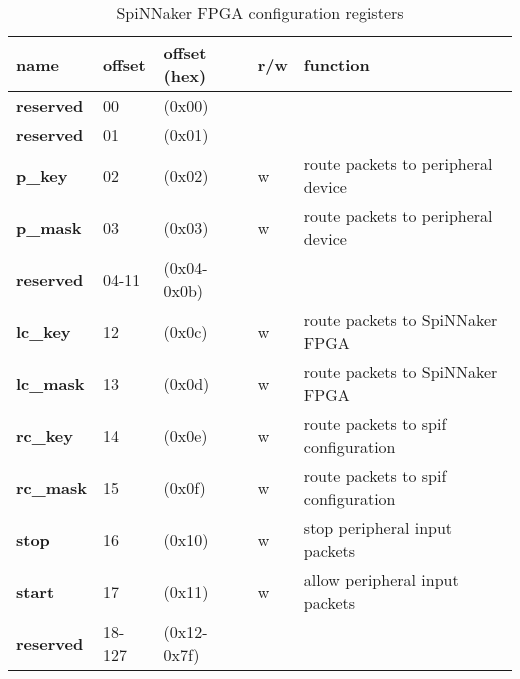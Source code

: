 \documentclass[11pt,a4paper,twoside]{article}
\begin{document}
\begin{center}
\begin{table}[!h]
	\begin{tabularx}{\textwidth}{| p{34mm} p{13mm} p{21mm} p{7mm} X |}
		\hline
		\textbf{name}                        & \textbf{offset}           & \textbf{offset} (hex)           & \textbf{r/w}        & \textbf{function} \\%
		\hline
		\hline
		\cellcolor{gray!25}\textbf{reserved} & \cellcolor{gray!25}00     & \cellcolor{gray!25}(0x00)       & \cellcolor{gray!25} & \cellcolor{gray!25}\\%
		\cellcolor{gray!25}\textbf{reserved} & \cellcolor{gray!25}01     & \cellcolor{gray!25}(0x01)       & \cellcolor{gray!25} & \cellcolor{gray!25}\\%
		\textbf{p\_key}                      & 02                        & (0x02)                          & w                   & route packets to peripheral device             \\%
		\textbf{p\_mask}                     & 03                        & (0x03)                          & w                   & route packets to peripheral device             \\%
		\cellcolor{gray!25}\textbf{reserved} & \cellcolor{gray!25}04-11  & \cellcolor{gray!25} (0x04-0x0b) & \cellcolor{gray!25} & \cellcolor{gray!25}\\%
		\textbf{lc\_key}                     & 12                        & (0x0c)                          & w                   & route packets to SpiNNaker FPGA  \\%
		\textbf{lc\_mask}                    & 13                        & (0x0d)                          & w                   & route packets to SpiNNaker FPGA  \\%
		\textbf{rc\_key}                     & 14                        & (0x0e)                          & w                   & route packets to spif configuration   \\%
		\textbf{rc\_mask}                    & 15                        & (0x0f)                          & w                   & route packets to spif configuration   \\%
		\textbf{stop}                        & 16                        & (0x10)                          & w                   & stop peripheral input packets         \\%
		\textbf{start}                       & 17                        & (0x11)                          & w                   & allow peripheral input packets         \\%
		\cellcolor{gray!25}\textbf{reserved} & \cellcolor{gray!25}18-127 & \cellcolor{gray!25} (0x12-0x7f) & \cellcolor{gray!25} & \cellcolor{gray!25}\\%
		\hline
	\end{tabularx}
	\caption{SpiNNaker FPGA configuration registers}
	\label{tab:spin_regs}
\end{table}
\end{center}
\end{document}
